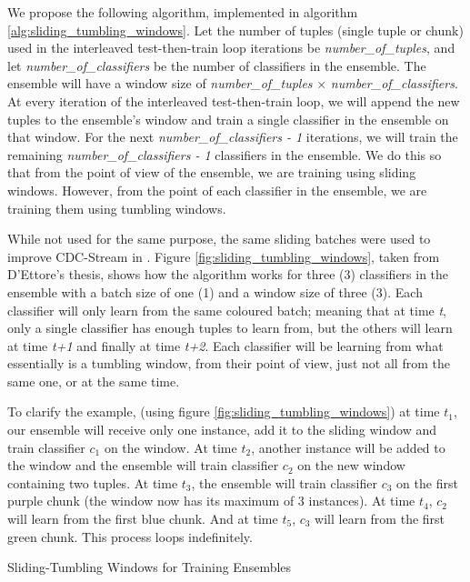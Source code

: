 \documentclass[runningheads]{llncs}
\begin{document}
We propose the following algorithm, implemented in algorithm \ref{alg:sliding_tumbling_windows}.
Let the number of tuples (single tuple or chunk) used in the interleaved test-then-train loop iterations be \textit{number\_of\_tuples}, and let \textit{number\_of\_classifiers} be the number of classifiers in the ensemble. The ensemble will have a window size of \textit{number\_of\_tuples} $\times$ \textit{number\_of\_classifiers}. At every iteration of the interleaved test-then-train loop, we will append the new tuples to the ensemble's window and train a single classifier in the ensemble on that window. For the next \textit{number\_of\_classifiers - 1} iterations, we will train the remaining \textit{number\_of\_classifiers - 1} classifiers in the ensemble. We do this so that from the point of view of the ensemble, we are training using sliding windows. However, from the point of each classifier in the ensemble, we are training them using tumbling windows.

While not used for the same purpose, the same sliding batches were used to improve CDC-Stream in \citep{d2016fine,d2017context}. Figure \ref{fig:sliding_tumbling_windows}, taken from D'Ettore's thesis, shows how the algorithm works for three (3) classifiers in the ensemble with a batch size of one (1) and a window size of three (3). Each classifier will only learn from the same coloured batch; meaning that at time \textit{t}, only a single classifier has enough tuples to learn from, but the others will learn at time \textit{t+1} and finally at time \textit{t+2}. Each classifier will be learning from what essentially is a tumbling window, from their point of view, just not all from the same one, or at the same time. 

To clarify the example, (using figure \ref{fig:sliding_tumbling_windows}) at time $t_1$, our ensemble will receive only one instance, add it to the sliding window and train classifier $c_1$ on the window. At time $t_2$, another instance will be added to the window and the ensemble will train classifier $c_2$ on the new window containing two tuples. At time $t_3$, the ensemble will train classifier $c_3$ on the first purple chunk (the window now has its maximum of 3 instances). At time $t_4$, $c_2$ will learn from the first blue chunk. And at time $t_5$, $c_3$ will learn from the first green chunk. This process loops indefinitely. 

\begin{algorithm}
\caption{Sliding-Tumbling Windows for Training Ensembles\label{alg:sliding_tumbling_windows}}
\end{algorithm}
\end{document}
